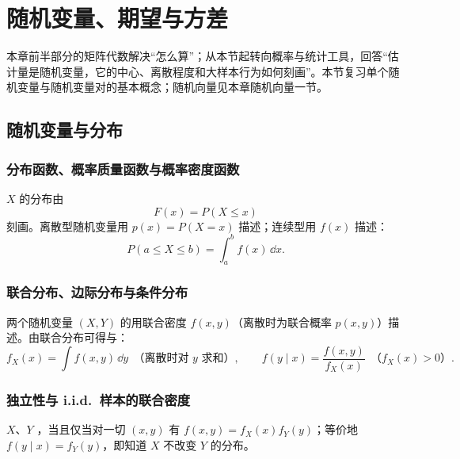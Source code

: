 \section{随机变量、期望与方差}\label{sec:U01b-rv}

本章前半部分的矩阵代数解决“怎么算”；从本节起转向概率与统计工具，回答“估计量是随机变量，它的中心、离散程度和大样本行为如何刻画”。本节复习单个随机变量与随机变量对的基本概念；随机向量见本章随机向量一节。

\subsection{随机变量与分布}

\subsubsection{分布函数、概率质量函数与概率密度函数}

 $X$ 的分布由
\[
F(x)=P(X\le x)
\]
刻画。离散型随机变量用 $p(x)=P(X=x)$ 描述；连续型用 $f(x)$ 描述：
\[
P(a\le X\le b)=\int_a^b f(x)\,\dd x .
\]

\subsubsection{联合分布、边际分布与条件分布}

两个随机变量 $(X,Y)$ 的用联合密度 $f(x,y)$（离散时为联合概率 $p(x,y)$）描述。由联合分布可得与：
\[
f_X(x)=\int f(x,y)\,\dd y\ \ \text{（离散时对 $y$ 求和）},\qquad
f(y\mid x)=\frac{f(x,y)}{f_X(x)}\ \ \text{（$f_X(x)>0$）}.
\]

\subsubsection{独立性与 i.i.d.\ 样本的联合密度}

$X$、$Y$ ，当且仅当对一切 $(x,y)$ 有 $f(x,y)=f_X(x)f_Y(y)$；等价地 $f(y\mid x)=f_Y(y)$，即知道 $X$ 不改变 $Y$ 的分布。

